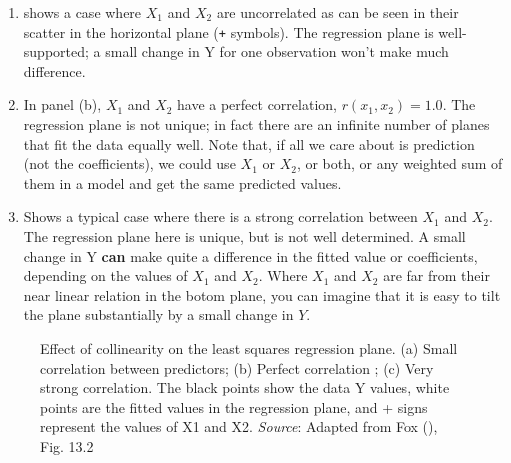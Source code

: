 \documentclass[
  letterpaper,
  10pt,
  krantz2]{krantz}
\begin{document}
\begin{enumerate}
\def\labelenumi{(\alph{enumi})}
\item
  shows a case where \(X_1\) and \(X_2\) are uncorrelated as can be seen
  in their scatter in the horizontal plane (\texttt{+} symbols). The
  regression plane is well-supported; a small change in Y for one
  observation won't make much difference.
\item
  In panel (b), \(X_1\) and \(X_2\) have a perfect correlation,
  \(r (x_1, x_2) = 1.0\). The regression plane is not unique; in fact
  there are an infinite number of planes that fit the data equally well.
  Note that, if all we care about is prediction (not the coefficients),
  we could use \(X_1\) or \(X_2\), or both, or any weighted sum of them
  in a model and get the same predicted values.
\item
  Shows a typical case where there is a strong correlation between
  \(X_1\) and \(X_2\). The regression plane here is unique, but is not
  well determined. A small change in Y \textbf{can} make quite a
  difference in the fitted value or coefficients, depending on the
  values of \(X_1\) and \(X_2\). Where \(X_1\) and \(X_2\) are far from
  their near linear relation in the botom plane, you can imagine that it
  is easy to tilt the plane substantially by a small change in \(Y\).
\end{enumerate}

\begin{figure}


\caption{\label{fig-collin-demo}Effect of collinearity on the least
squares regression plane. (a) Small correlation between predictors; (b)
Perfect correlation ; (c) Very strong correlation. The black points show
the data Y values, white points are the fitted values in the regression
plane, and + signs represent the values of X1 and X2. \emph{Source}:
Adapted from Fox (), Fig. 13.2}

\end{figure}%
\end{document}
